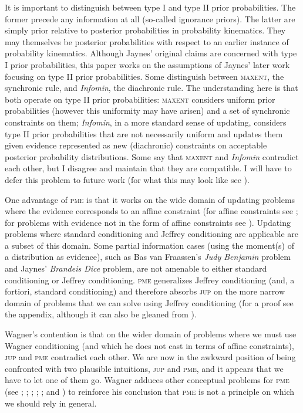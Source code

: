 It is important to distinguish between type I and type II prior
probabilities. The former precede any information at all (so-called
ignorance priors). The latter are simply prior relative to posterior
probabilities in probability kinematics. They may themselves be
posterior probabilities with respect to an earlier instance of
probability kinematics. Although Jaynes' original claims are concerned
with type I prior probabilities, this paper works on the assumptions
of Jaynes' later work focusing on type II prior probabilities. Some
distinguish between \textsc{maxent}, the synchronic rule, and
\emph{Infomin}, the diachronic rule. The understanding here is that
both operate on type II prior probabilities: \textsc{maxent} considers
uniform prior probabilities (however this uniformity may have arisen)
and a set of synchronic constraints on them; \emph{Infomin}, in a more
standard sense of updating, considers type II prior probabilities that
are not necessarily uniform and updates them given evidence
represented as new (diachronic) constraints on acceptable posterior
probability distributions. Some say that \textsc{maxent} and
\emph{Infomin} contradict each other, but I disagree and maintain that
they are compatible. I will have to defer this problem to future work
(for what this may look like see ).

One advantage of \textsc{pme} is that it works on the wide domain of
updating problems where the evidence corresponds to an affine
constraint (for affine constraints see ; for problems with
evidence not in the form of affine constraints see ).
Updating problems where standard conditioning and Jeffrey conditioning
are applicable are a subset of this domain. Some partial information
cases (using the moment(s) of a distribution as evidence), such as Bas
van Fraassen's \emph{Judy Benjamin} problem and Jaynes' \emph{Brandeis
  Dice} problem, are not amenable to either standard conditioning or
Jeffrey conditioning. \textsc{pme} generalizes Jeffrey conditioning
(and, a fortiori, standard conditioning) and therefore absorbs
\textsc{jup} on the more narrow domain of problems that we can solve
using Jeffrey conditioning (for a proof see the appendix, although it
can also be gleaned from ).

Wagner's contention is that on the wider domain of problems where we
must use Wagner conditioning (and which he does not cast in terms of
affine constraints), \textsc{jup} and \textsc{pme} contradict each
other. We are now in the awkward position of being confronted with two
plausible intuitions, \textsc{jup} and \textsc{pme}, and it appears
that we have to let one of them go. Wagner adduces other conceptual
problems for \textsc{pme} (see ;
; ;
; ; and
) to reinforce his conclusion that
\textsc{pme} is not a principle on which we should rely in general.

